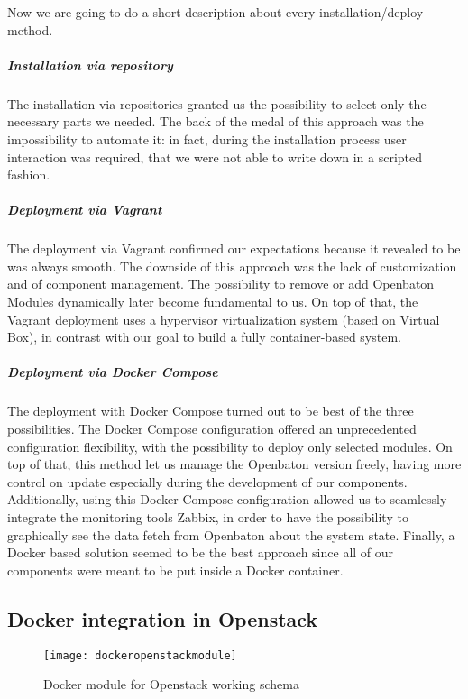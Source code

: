 Now we are going to do a short description about every installation/deploy method.

\subparagraph*{Installation via repository}
The installation via repositories granted us the possibility to select only the
necessary parts we needed. The back of the medal of this approach was the
impossibility to automate it: in fact, during the installation process user
interaction was required, that we were not able to write down in a scripted
fashion.

\subparagraph*{Deployment via Vagrant}
The deployment via Vagrant confirmed our expectations because it revealed to be
was always smooth. The downside of this approach was the lack of customization
and of component management. The possibility to remove or add Openbaton Modules
dynamically later become fundamental to us. On top of that, the Vagrant
deployment uses a hypervisor virtualization system (based on Virtual Box), in
contrast with our goal to build a fully container-based system.

\subparagraph*{Deployment via Docker Compose}
The deployment with Docker Compose turned out to be best of the three
possibilities. The Docker Compose configuration offered an unprecedented
configuration flexibility, with the possibility to deploy only selected modules.
On top of that, this method let us manage the Openbaton version freely, having
more control on update especially during the development of our components.
Additionally, using this Docker Compose configuration allowed us to seamlessly
integrate the monitoring tools Zabbix, in order to have the possibility to
graphically see the data fetch from Openbaton about the system state. Finally, a
Docker based solution seemed to be the best approach since all of our components
were meant to be put inside a Docker container.

\subsection{Docker integration in Openstack}

\begin{figure}[t]
  \centering
  \texttt{[image: dockeropenstackmodule]}
  \caption[Docker module for Openstack working schema]{Docker module for Openstack
    working schema~\cite{openstackDockerModule}}
  \label{chap:archimpl:sec:fistattempt:img:dockeropnestackmodule}
\end{figure}

